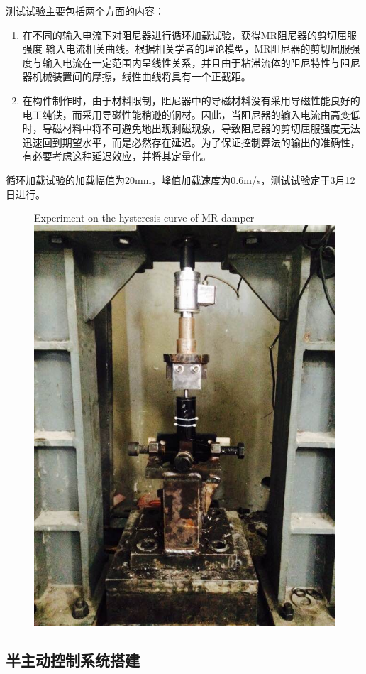 测试试验主要包括两个方面的内容：

\begin{enumerate}
	\item 在不同的输入电流下对阻尼器进行循环加载试验，获得MR阻尼器的剪切屈服强度-输入电流相关曲线。根据相关学者的理论模型，MR阻尼器的剪切屈服强度与输入电流在一定范围内呈线性关系，并且由于粘滞流体的阻尼特性与阻尼器机械装置间的摩擦，线性曲线将具有一个正截距。
	
	\item 在构件制作时，由于材料限制，阻尼器中的导磁材料没有采用导磁性能良好的电工纯铁，而采用导磁性能稍逊的钢材。因此，当阻尼器的输入电流由高变低时，导磁材料中将不可避免地出现剩磁现象，导致阻尼器的剪切屈服强度无法迅速回到期望水平，而是必然存在延迟。为了保证控制算法的输出的准确性，有必要考虑这种延迟效应，并将其定量化。
\end{enumerate}

循环加载试验的加载幅值为20mm，峰值加载速度为0.6m/s，测试试验定于3月12日进行。



\begin{figure}[H]
	\centering
		{Experiment on the hysteresis curve of MR damper}
	\label{shiyan}
	\includegraphics[width=.5\linewidth]{figure/shiyan}
\end{figure}








\subsection{半主动控制系统搭建}

